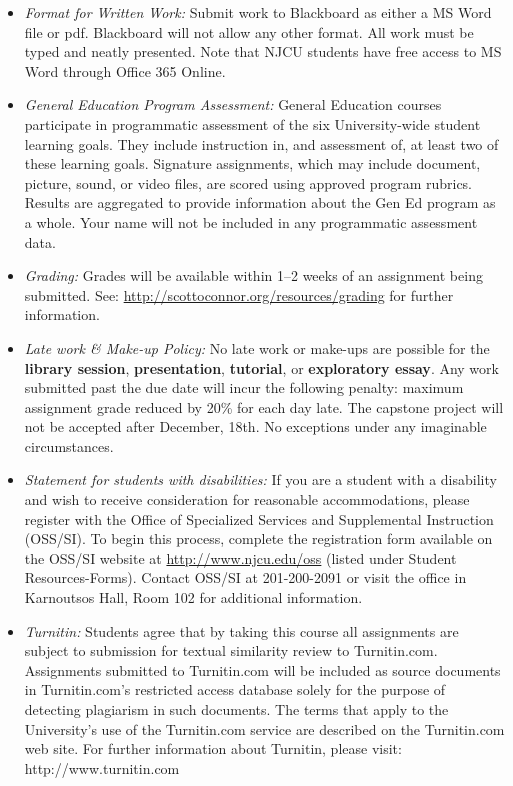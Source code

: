 \documentclass[article,oneside]{memoir}
\begin{document}
\begin{itemize}
\item \textit{Format for Written Work:} Submit work to Blackboard as either a MS Word file or pdf. Blackboard will not allow any other format. All work must be typed and neatly presented. Note that NJCU students have free access to MS Word through Office 365 Online.


\item \textit{General Education Program Assessment:} General Education courses participate in programmatic assessment of the six University-wide student learning goals. They include instruction in, and assessment of, at least two of these learning goals. Signature assignments, which may include document, picture, sound, or video files, are scored using approved program rubrics. Results are aggregated to provide information about the Gen Ed program as a whole. Your name will not be included in any programmatic assessment data.

\item \textit{Grading:} Grades will be available within 1--2 weeks of an assignment being submitted. See: \href{http://scottoconnor.org/resources/grading}{http://scottoconnor.org/resources/grading} for further information.


\item \textit{Late work \& Make-up Policy:} No late work or make-ups are possible for the \textbf{library session}, \textbf{presentation}, \textbf{tutorial}, or \textbf{exploratory essay}. Any work submitted past the due date will incur the following penalty: maximum assignment grade reduced by 20\% for each day late. The capstone project will not be accepted after December, 18th.  No exceptions under any imaginable circumstances.

\item \textit{Statement for students with disabilities:} If you are a student
with a disability and wish to receive consideration for reasonable
accommodations, please register with the Office of Specialized Services
and Supplemental Instruction (OSS/SI). To begin this process, complete
the registration form available on the OSS/SI website at
\href{http://www.njcu.edu/oss}{http://www.njcu.edu/oss}
(listed under Student Resources-Forms). Contact OSS/SI at 201-200-2091
or visit the office in Karnoutsos Hall, Room 102 for additional
information.

\item \textit{Turnitin:} Students agree that by taking this course all assignments are subject to submission for textual similarity review to Turnitin.com. Assignments submitted to Turnitin.com will be included as source documents in Turnitin.com's restricted access database solely for the purpose of detecting plagiarism in such documents.  The terms that apply to the University’s use of the Turnitin.com service are described on the Turnitin.com web site.  For further information about Turnitin, please visit: http://www.turnitin.com 


\end{itemize}
\end{document}
